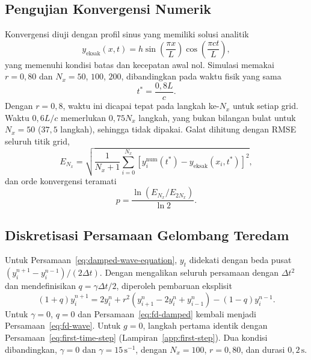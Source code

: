\documentclass[aps,prl,twocolumn,superscriptaddress]{revtex4-2}
\begin{document}
    \subsection{Pengujian Konvergensi Numerik}

        Konvergensi diuji dengan profil sinus yang memiliki solusi analitik
        \begin{equation}
            y_{\mathrm{eksak}}(x,t) = h\sin\left(\frac{\pi x}{L}\right) \cos\left(\frac{\pi c t}{L}\right),
            \label{eq:analytical-solution}
        \end{equation}
        yang memenuhi kondisi batas dan kecepatan awal nol. 
        Simulasi memakai $r=0{,}80$ dan $N_x=50$, $100$, $200$, dibandingkan pada waktu fisik yang sama
        \begin{equation}
            t^*=\frac{0{,}8L}{c}.
        \end{equation}
        Dengan $r=0{,}8$, waktu ini dicapai tepat pada langkah ke-$N_x$ untuk setiap grid. 
        Waktu $0{,}6L/c$ memerlukan $0{,}75N_x$ langkah, yang bukan bilangan bulat untuk $N_x=50$ ($37{,}5$ langkah), sehingga tidak dipakai.
        Galat dihitung dengan RMSE seluruh titik grid,
        \begin{equation}
            E_{N_x} = \sqrt{ \frac{1}{N_x+1} \sum_{i=0}^{N_x} \left[ y_i^{\mathrm{num}}(t^*) - y_{\mathrm{eksak}}(x_i,t^*)\right]^2},
            \label{eq:rmse}
        \end{equation}
        dan orde konvergensi teramati
        \begin{equation}
            p = \frac{ \ln(E_{N_x}/E_{2N_x}) }{\ln 2}.
            \label{eq:convergence-order}
        \end{equation}

    \subsection{Diskretisasi Persamaan Gelombang Teredam}

        Untuk Persamaan~\eqref{eq:damped-wave-equation}, $y_t$ didekati dengan beda pusat $(y_i^{n+1}-y_i^{n-1})/(2\Delta t)$. 
        Dengan mengalikan seluruh persamaan dengan $\Delta t^2$ dan mendefinisikan $q=\gamma\Delta t/2$, diperoleh pembaruan eksplisit
        \begin{equation}
            (1+q)y_i^{n+1} = 2y_i^n +r^2 \left( y_{i+1}^n-2y_i^n+y_{i-1}^n \right) -(1-q)y_i^{n-1}.
            \label{eq:fd-damped}
        \end{equation}
        Untuk $\gamma=0$, $q=0$ dan Persamaan~\eqref{eq:fd-damped} kembali menjadi Persamaan~\eqref{eq:fd-wave}. 
        Untuk $g=0$, langkah pertama identik dengan Persamaan~\eqref{eq:first-time-step} (Lampiran~\ref{app:first-step}). 
        Dua kondisi dibandingkan, $\gamma=0$ dan $\gamma=15\,\mathrm{s}^{-1}$, dengan $N_x=100$, $r=0{,}80$, dan durasi $0{,}2\,\mathrm{s}$.
\end{document}
